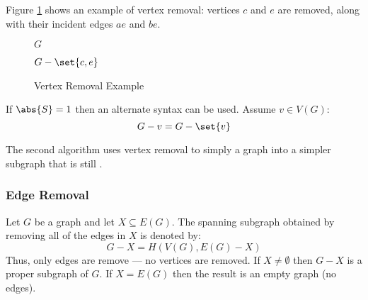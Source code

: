 Figure \ref{fig:vremove} shows an example of vertex removal: vertices \(c\) and \(e\) are removed, along with their
incident edges \(ae\) and \(be\).

\begin{figure}[h]
  \label{fig:vremove}
  \begin{minipage}{3in}
    \begin{center}

      \bigskip

      \(G\)
    \end{center}
  \end{minipage}
  \begin{minipage}{3in}
    \begin{center}

      \bigskip

      \(G-\set{c,e}\)
    \end{center}
  \end{minipage}
  \caption{Vertex Removal Example}
\end{figure}

If \(\abs{S}=1\) then an alternate syntax can be used.  Assume \(v\in V(G)\):
\[G-v=G-\set{v}\]

The second algorithm uses vertex removal to simply a  graph into a simpler subgraph that is still
.

\subsubsection{Edge Removal}

Let \(G\) be a graph and let \(X\subseteq E(G)\).  The spanning subgraph obtained by removing all of the edges
in \(X\) is denoted by:
\[G-X=H\left(V(G),E(G)-X\right)\]
Thus, only edges are remove --- no vertices are removed.  If \(X\ne\emptyset\) then \(G-X\) is a proper subgraph of
\(G\).  If \(X=E(G)\) then the result is an empty graph (no edges).

